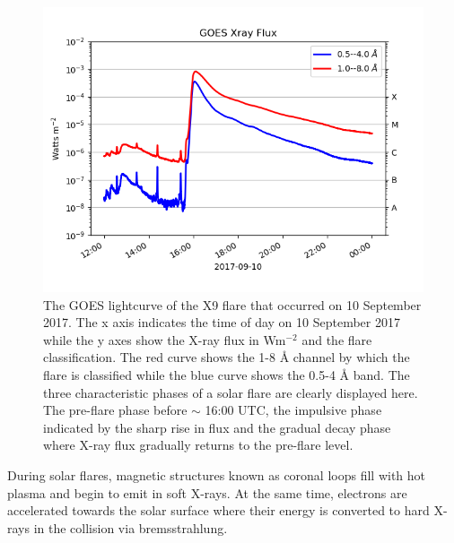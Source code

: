 \begin{figure}
    \centering
    \includegraphics[width=\columnwidth]{Images/GOES_Xclass.png}
    \caption[GOES lightcurve for X9 class flare on 10 September 2017.]{The GOES lightcurve of the X9 flare that occurred on 10 September 2017. The x axis indicates the time of day on 10 September 2017 while the y axes show the X-ray flux in Wm$^{-2}$ and the flare classification. The red curve shows the 1-8 {\AA} channel by which the flare is classified while the blue curve shows the 0.5-4 {\AA} band. The three characteristic phases of a solar flare are clearly displayed here. The pre-flare phase before $\sim$ 16:00 UTC, the impulsive phase indicated by the sharp rise in flux and the gradual decay phase where X-ray flux gradually returns to the pre-flare level.}
    \label{fig:GOES_Xclass}
\end{figure}
During solar flares, magnetic structures known as coronal loops fill with hot plasma and begin to emit in soft X-rays. At the same time, electrons are accelerated towards the solar surface where their energy is converted to hard X-rays in the collision via bremsstrahlung. 

